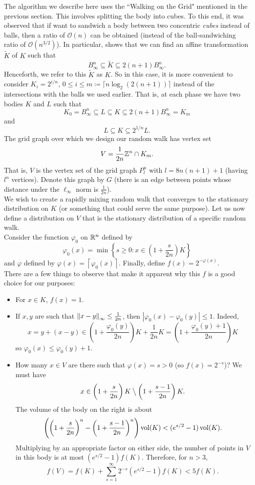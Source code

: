 The algorithm we describe here uses the ``Walking on the Grid" mentioned in the previous section. This involves splitting the body into cubes. To this end, it was observed that if want to sandwich a body between two concentric \textit{cubes} instead of balls, then a ratio of $\mathcal{O}(n)$ can be obtained (instead of the ball-sandwiching ratio of $\mathcal{O}(n^{3/2})$). In particular, \cite{applegate-kannan-cube-sandwich} shows that we can find an affine transformation $\tilde K$ of $K$ such that
\[ B_\infty^n\subseteq \tilde{K}\subseteq 2(n+1)B_\infty^n. \]
Henceforth, we refer to this $\tilde{K}$ as $K$. So in this case, it is more convenient to consider $K_i=2^{i/n}$, $0\leq i\leq m\coloneqq \lceil n\log_2(2(n+1))\rceil$ instead of the intersections with the balls we used earlier. That is, at each phase we have two bodies $K$ and $L$ such that
\[ K_0 = B_\infty^n \subseteq L \subseteq K \subseteq 2(n+1) B_\infty^n = K_m \]
and
\[ L\subseteq K\subseteq 2^{1/n}L. \]
The grid graph over which we design our random walk has vertex set
\[ V = \frac{1}{2n}\mathbb{Z}^n \cap K_m.  \]
That is, $V$ is the vertex set of the grid graph $P_l^n$ with $l=8n(n+1)+1$ (having $l^n$ vertices). Denote this graph by $G$ (there is an edge between points whose distance under the $\ell_\infty$ norm is $\frac{1}{2n}$).\\
We wish to create a rapidly mixing random walk that converges to the stationary distribution on $K$ (or something that could serve the same purpose). Let us now define a distribution on $V$ that is the stationary distribution of a specific random walk.\\
Consider the function $\varphi_0$ on $\mathbb{R}^n$ defined by
\[ \varphi_0(x) = \min\left\{s\geq 0 : x \in \left(1+\frac{s}{2n}\right)K\right\} \]
and $\varphi$ defined by $\varphi(x)=\left\lceil \varphi_0(x)\right\rceil$. Finally, define $f(x)=2^{-\varphi(x)}$.\\
There are a few things to observe that make it apparent why this $f$ is a good choice for our purposes:
\begin{itemize}
	\item For $x\in K$, $f(x)=1$.
	\item If $x,y$ are such that $\left\lVert x-y\right\rVert_\infty \leq \frac{1}{2n}$, then $|\varphi_0(x)-\varphi_0(y)|\leq 1$. Indeed,
	\[ x = y + (x-y) \in \left(1+\frac{\varphi_0(y)}{2n}\right)K + \frac{1}{2n}K = \left(1+\frac{\varphi_0(y)+1}{2n}\right)K \]
	so $\varphi_0(x) \leq \varphi_0(y)+1$.
	\item How many $x\in V$ are there such that $\varphi(x)=s>0$ (so $f(x)=2^{-s}$)? We must have
	\[ x \in \left(1+\frac{s}{2n}\right)K \mathbin{\big\backslash} \left(1+\frac{s-1}{2n}\right)K. \]
	The volume of the body on the right is about
	\[ \left(\left(1+\frac{s}{2n}\right)^n - \left(1+\frac{s-1}{2n}\right)^n\right) \operatorname{vol}(K) < (e^{s/2}-1) \operatorname{vol}(K). \]
	Multiplying by an appropriate factor on either side, the number of points in $V$ in this body is at most $(e^{s/2}-1)f(K)$. Therefore, for $n>3$,
	\[ f(V) = f(K) + \sum_{s=1}^\infty 2^{-s}(e^{s/2}-1)f(K) < 5f(K). \]
\end{itemize}
